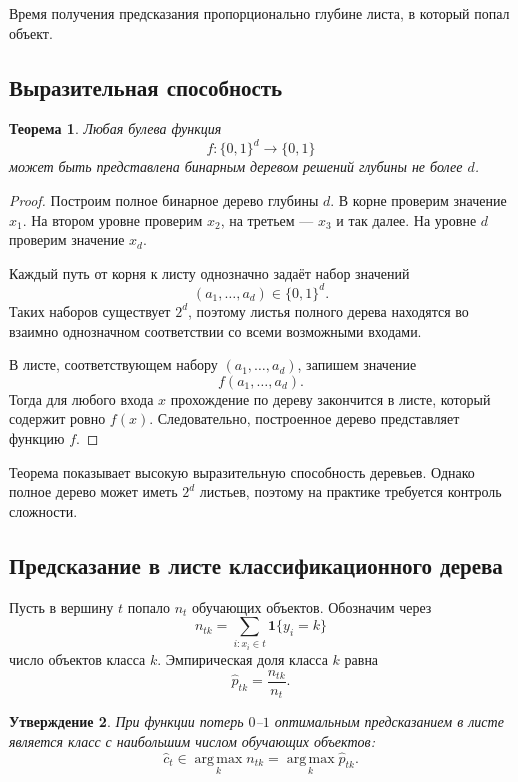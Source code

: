 \documentclass[12pt,a4paper]{article}
\theoremstyle{plain}
\newtheorem{theorem}{Теорема}[section]
\newtheorem{proposition}[theorem]{Утверждение}
\theoremstyle{definition}
\theoremstyle{remark}
\newcommand{\ind}{\mathbf{1}}
\newcommand{\argmax}{\operatorname*{arg\,max}}
\begin{document}
Время получения предсказания пропорционально глубине листа, в который
попал объект.

\subsection{Выразительная способность}

\begin{theorem}
Любая булева функция
\[
    f:\{0,1\}^{d}\to\{0,1\}
\]
может быть представлена бинарным деревом решений глубины не более $d$.
\end{theorem}

\begin{proof}
Построим полное бинарное дерево глубины $d$. В корне проверим значение
$x_1$. На втором уровне проверим $x_2$, на третьем --- $x_3$ и так далее.
На уровне $d$ проверим значение $x_d$.

Каждый путь от корня к листу однозначно задаёт набор значений
\[
    (a_1,\ldots,a_d)\in\{0,1\}^{d}.
\]
Таких наборов существует $2^d$, поэтому листья полного дерева находятся
во взаимно однозначном соответствии со всеми возможными входами.

В листе, соответствующем набору $(a_1,\ldots,a_d)$, запишем значение
\[
    f(a_1,\ldots,a_d).
\]
Тогда для любого входа $x$ прохождение по дереву закончится в листе,
который содержит ровно $f(x)$. Следовательно, построенное дерево
представляет функцию $f$.
\end{proof}

Теорема показывает высокую выразительную способность деревьев. Однако
полное дерево может иметь $2^d$ листьев, поэтому на практике требуется
контроль сложности.

\subsection{Предсказание в листе классификационного дерева}

Пусть в вершину $t$ попало $n_t$ обучающих объектов. Обозначим через
\[
    n_{tk}
    =
    \sum_{i:x_i\in t}\ind\{y_i=k\}
\]
число объектов класса $k$. Эмпирическая доля класса $k$ равна
\[
    \widehat{p}_{tk}
    =
    \frac{n_{tk}}{n_t}.
\]

\begin{proposition}
При функции потерь $0$--$1$ оптимальным предсказанием в листе является
класс с наибольшим числом обучающих объектов:
\[
    \widehat{c}_t
    \in
    \argmax_k n_{tk}
    =
    \argmax_k\widehat{p}_{tk}.
\]
\end{proposition}
\end{document}

